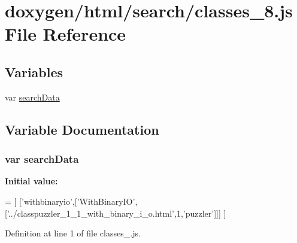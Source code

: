 \hypertarget{a00069}{}\section{doxygen/html/search/classes\+\_\+8.js File Reference}
\label{a00069}
\subsection*{Variables}
\begin{DoxyCompactItemize}
\item 
var \hyperlink{a00069_ad01a7523f103d6242ef9b0451861231e}{search\+Data}
\end{DoxyCompactItemize}


\subsection{Variable Documentation}
\hypertarget{a00069_ad01a7523f103d6242ef9b0451861231e}{}
\subsubsection[{search\+Data}]{\setlength{\rightskip}{0pt plus 5cm}var search\+Data}\label{a00069_ad01a7523f103d6242ef9b0451861231e}
{\bfseries Initial value\+:}
\begin{DoxyCode}
=
[
  [\textcolor{stringliteral}{'withbinaryio'},[\textcolor{stringliteral}{'WithBinaryIO'},[\textcolor{stringliteral}{'../classpuzzler\_1\_1\_with\_binary\_i\_o.html'},1,\textcolor{stringliteral}{'puzzler'}]]]
]
\end{DoxyCode}


Definition at line 1 of file classes\+\_.\+js.

